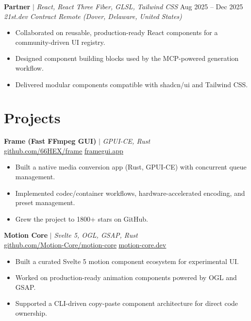 \documentclass[10pt,a4paper]{article}
\let\oldhref\href
\renewcommand{\href}[2]{\oldhref{#1}{\uline{#2}}}
\begin{document}
\textbf{Partner} $|$ \textit{React, React Three Fiber, GLSL, Tailwind CSS} \hfill Aug 2025 -- Dec 2025\\
\textit{21st.dev \textbar{} Contract \textbar{} Remote (Dover, Delaware, United States)}
\begin{itemize}
  \item Collaborated on reusable, production-ready React components for a community-driven UI registry.
  \item Designed component building blocks used by the MCP-powered generation workflow.
  \item Delivered modular components compatible with shadcn/ui and Tailwind CSS.
\end{itemize}

\section{Projects}

\textbf{Frame (Fast FFmpeg GUI)} $|$ \textit{GPUI-CE, Rust} \hfill\\
\href{https://github.com/66HEX/frame}{github.com/66HEX/frame} \textbar{} \href{https://www.framegui.app/}{framegui.app}
\begin{itemize}
  \item Built a native media conversion app (Rust, GPUI-CE) with concurrent queue management.
  \item Implemented codec/container workflows, hardware-accelerated encoding, and preset management.
  \item Grew the project to 1800+ stars on GitHub.
\end{itemize}

\textbf{Motion Core} $|$ \textit{Svelte 5, OGL, GSAP, Rust} \hfill\\
\href{https://github.com/Motion-Core/motion-core}{github.com/Motion-Core/motion-core} \textbar{} \href{https://motion-core.dev/}{motion-core.dev}
\begin{itemize}
  \item Built a curated Svelte 5 motion component ecosystem for experimental UI.
  \item Worked on production-ready animation components powered by OGL and GSAP.
  \item Supported a CLI-driven copy-paste component architecture for direct code ownership.
\end{itemize}
\end{document}
